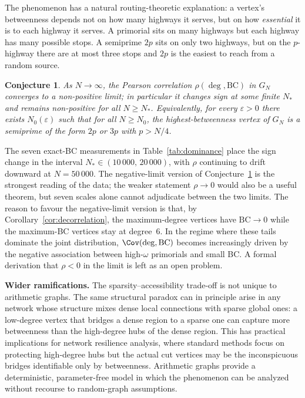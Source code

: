 \documentclass[11pt]{article}
\theoremstyle{plain}
\newtheorem{conjecture}[theorem]{Conjecture}
\theoremstyle{definition}
\newcommand{\BC}{\mathrm{BC}}
\begin{document}
The phenomenon has a natural routing-theoretic explanation: a vertex's betweenness depends not on how many highways it serves, but on how \emph{essential} it is to each highway it serves.
A primorial sits on many highways but each highway has many possible stops. A semiprime $2p$ sits on only two highways, but on the $p$-highway there are at most three stops and $2p$ is the easiest to reach from a random source. 

\begin{conjecture}\label{conj:scaling}
As $N \to \infty$, the Pearson correlation $\rho(\deg, \BC)$ in $G_N$ converges to a non-positive limit;
in particular it changes sign at some finite $N_*$ and remains non-positive for all $N \ge N_*$.
Equivalently, for every $\varepsilon > 0$ there exists $N_0(\varepsilon)$ such that for all $N \ge N_0$,
the highest-betweenness vertex of $G_N$ is a semiprime of the form $2p$ or $3p$ with $p > N/4$.
\end{conjecture}

The seven exact-BC measurements in Table~\ref{tab:dominance} place the sign change in the interval
$N_* \in (10\,000,\, 20\,000)$, with $\rho$ continuing to drift downward at $N = 50\,000$.
The negative-limit version of Conjecture~\ref{conj:scaling} is the strongest reading of the data;
the weaker statement $\rho \to 0$ would also be a useful theorem, but seven scales alone cannot
adjudicate between the two limits. The reason to favour the negative-limit version is that, by
Corollary~\ref{cor:decorrelation}, the maximum-degree vertices have $\BC \to 0$ while
the maximum-BC vertices stay at degree~$6$. In the regime where these tails dominate the joint
distribution, $\Cov(\deg, \BC)$ becomes increasingly driven by the negative association between
high-$\omega$ primorials and small BC. A formal derivation that $\rho < 0$ in the limit
is left as an open problem.


\medskip
\noindent\textbf{Wider ramifications.}
The sparsity--accessibility trade-off is not unique to arithmetic graphs.
The same structural paradox can in principle arise in any network whose structure mixes dense local connections with sparse global ones:
a low-degree vertex that bridges a dense region to a sparse one can capture more betweenness than the high-degree hubs of the dense region.
This has practical implications for network resilience analysis, where standard methods focus on protecting high-degree hubs but the actual cut vertices may be the inconspicuous bridges identifiable only by betweenness.
Arithmetic graphs provide a deterministic, parameter-free model in which the phenomenon can be analyzed without recourse to random-graph assumptions. 
\end{document}
